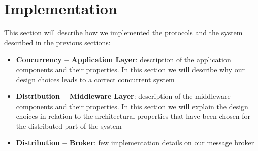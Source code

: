 \section{Implementation}\label{}

This section will describe how we implemented the protocols and the system
described in the previous sections:

\begin{itemize}
\item \textbf{Concurrency -- Application Layer}:
  description of the application components and their properties. In this
  section we will describe why our design choices leads to a correct concurrent
  system
\item \textbf{Distribution -- Middleware Layer}:
  description of the middleware components and their properties. In this
  section we will explain the design choices in relation to the architectural
  properties that have been chosen for the distributed part of the system
\item \textbf{Distribution -- Broker}:
  few implementation details on our message broker
\end{itemize}






